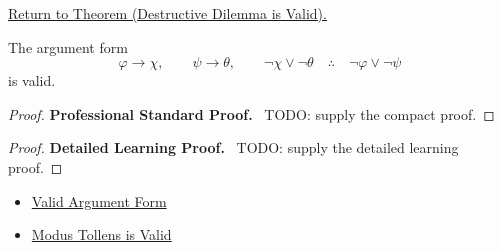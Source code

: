 \newpage
{}
\label{prf:destructive-dilemma-validity-propositional-logic}

\begin{remark*}[Return]
\hyperref[thm:destructive-dilemma-validity-propositional-logic]{Return to Theorem (Destructive Dilemma is Valid).}
\end{remark*}

\begin{theorem*}
The argument form
\[
\varphi\to\chi,\qquad \psi\to\theta,\qquad \neg\chi\lor\neg\theta
\quad\therefore\quad
\neg\varphi\lor\neg\psi
\]
is valid.
\end{theorem*}

\begin{proof}
\textbf{Professional Standard Proof.}~
TODO: supply the compact proof.
\end{proof}

\begin{proof}
\textbf{Detailed Learning Proof.}~
TODO: supply the detailed learning proof.
\end{proof}

\begin{remark*}
\end{remark*}

\begin{dependencies}
\begin{itemize}
  \item \hyperref[def:valid-argument-form-propositional-logic]{Valid Argument Form}
  \item \hyperref[thm:modus-tollens-validity-propositional-logic]{Modus Tollens is Valid}
\end{itemize}
\end{dependencies}

\clearpage
